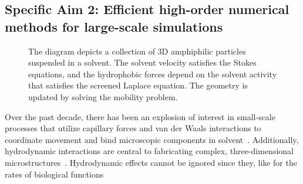 \subsection{Specific Aim 2: Efficient high-order numerical methods for
large-scale simulations}
\label{subsec:specific_aim_2}
\begin{figure}
    \vspace{-20pt}
    \caption{\label{fig:flow_map} \footnotesize The diagram depicts a collection of 3D
    amphiphilic particles suspended in a solvent. The solvent velocity satisfies
    the Stokes equations, and the hydrophobic forces depend on the
    solvent activity that satisfies the screened Laplace equation. The
    geometry is updated by solving the mobility problem.} 
\end{figure}
Over the past decade, there has been an explosion of interest in
small-scale processes that utilize capillary forces and van der Waals
interactions to coordinate movement
and bind microscopic components in solvent~\cite{Pandey2011, Zhang2017, Siontorou2017}.
Additionally, hydrodynamic interactions are central to fabricating complex,
three-dimensional microstructures~\cite{Dasgupta2017, Leong2007, Reynolds2019, Cho2010}.
Hydrodynamic effects cannot
be ignored since they, like for the rates of biological functions 

